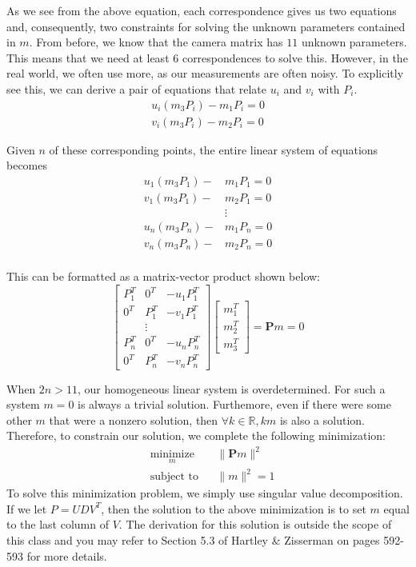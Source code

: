 \documentclass[a4paper, 12pt]{article}
\begin{document}
As we see from the above equation, each correspondence gives us two equations and, consequently, two constraints for solving the unknown parameters contained in $m$. From before, we know that the camera matrix has $11$ unknown parameters. This means that we need at least $6$ correspondences to solve this. However, in the real world, we often use more, as our measurements are often noisy. To explicitly see this, we can derive a pair of equations that relate $u_i$ and $v_i$ with $P_i$. 
\begin{align*}
u_i(m_3P_i) - m_1P_i = 0\\
v_i(m_3P_i) - m_2P_i = 0
\end{align*}

Given $n$ of these corresponding points, the entire linear system of equations becomes
\begin{align*}
u_1(m_3P_1) -& m_1P_1 = 0\\
v_1(m_3P_1) -& m_2P_1 = 0\\
&\vdots\\
u_n(m_3P_n) -& m_1P_n = 0\\
v_n(m_3P_n) -& m_2P_n = 0\\
\end{align*}

This can be formatted as a matrix-vector product shown below:
\begin{equation}
\begin{bmatrix} 
P_1^T & 0^T & -u_1P_1^T \\
0^T & P_1^T & -v_1P_1^T \\
& \vdots &\\
P_n^T & 0^T & -u_nP_n^T \\
0^T & P_n^T & -v_nP_n^T 
\end{bmatrix}
\begin{bmatrix}
m_1^T \\ m_2^T \\m_3^T
\end{bmatrix} = \mathbf{P}m = 0
\label{eq:linearsystem}
\end{equation}

When $2n > 11$, our homogeneous linear system is overdetermined. For such a system $m=0$ is always a trivial solution. Furthemore, even if there were some other $m$ that were a nonzero solution, then $\forall k\in \mathbb{R},km$ is also a solution. Therefore, to constrain our solution, we complete the following minimization:
\begin{equation}
\begin{aligned}
    & \underset{m}{\text{minimize}}
    & & \|\mathbf{P}m\|^2 \\
    & \text{subject to}
    & & \|m\|^2 = 1
\end{aligned}
\end{equation}
To solve this minimization problem, we simply use singular value decomposition. If we let $P = UDV^T$, then the solution to the above minimization is to set $m$ equal to the last column of $V$. The derivation for this solution is outside the scope of this class and you may refer to Section 5.3 of Hartley \& Zisserman on pages 592-593 for more details.
\end{document}

